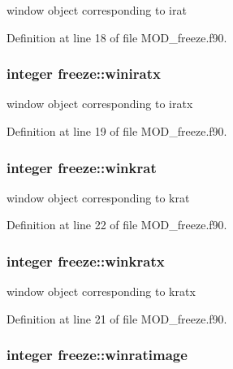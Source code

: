 window object corresponding to irat 



Definition at line 18 of file M\-O\-D\-\_\-freeze.\-f90.

\hypertarget{classfreeze_ab2fccc00f356918f860e43c2d1ce75d1}{
\subsubsection[{winiratx}]{\setlength{\rightskip}{0pt plus 5cm}integer freeze\-::winiratx}}\label{classfreeze_ab2fccc00f356918f860e43c2d1ce75d1}


window object corresponding to iratx 



Definition at line 19 of file M\-O\-D\-\_\-freeze.\-f90.

\hypertarget{classfreeze_ae8561a49dbd4f2ca81de976fe32e20d0}{
\subsubsection[{winkrat}]{\setlength{\rightskip}{0pt plus 5cm}integer freeze\-::winkrat}}\label{classfreeze_ae8561a49dbd4f2ca81de976fe32e20d0}


window object corresponding to krat 



Definition at line 22 of file M\-O\-D\-\_\-freeze.\-f90.

\hypertarget{classfreeze_a6d6f5dce334fa4a1acea8252e22392d1}{
\subsubsection[{winkratx}]{\setlength{\rightskip}{0pt plus 5cm}integer freeze\-::winkratx}}\label{classfreeze_a6d6f5dce334fa4a1acea8252e22392d1}


window object corresponding to kratx 



Definition at line 21 of file M\-O\-D\-\_\-freeze.\-f90.

\hypertarget{classfreeze_aa821a95ce853304c4fa818234dc51d22}{
\subsubsection[{winratimage}]{\setlength{\rightskip}{0pt plus 5cm}integer freeze\-::winratimage}}\label{classfreeze_aa821a95ce853304c4fa818234dc51d22}


